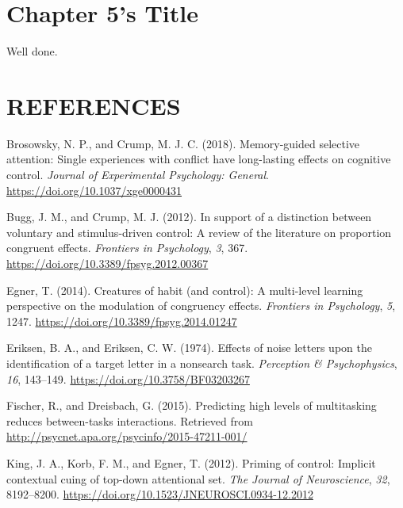 \documentclass[]{DissertateCUNY}
\begin{document}
\chapter{Chapter 5's Title}

Well done.

\FloatBarrier
\newpage

\fancyhead[R]{\thepage}
\fancyfoot[C]{}

\chapter*{REFERENCES}

\setlength{\parindent}{-0.5in}
\setlength{\leftskip}{0.5in}
\setlength{\parskip}{6pt}

\noindent

\hypertarget{refs}{}
\leavevmode\hypertarget{ref-brosowsky_memory-guided_2018}{}%
Brosowsky, N. P., and Crump, M. J. C. (2018). Memory-guided selective
attention: Single experiences with conflict have long-lasting effects on
cognitive control. \emph{Journal of Experimental Psychology: General}.
\url{https://doi.org/10.1037/xge0000431}

\leavevmode\hypertarget{ref-bugg_support_2012}{}%
Bugg, J. M., and Crump, M. J. (2012). In support of a distinction
between voluntary and stimulus-driven control: A review of the
literature on proportion congruent effects. \emph{Frontiers in
Psychology}, \emph{3}, 367.
\url{https://doi.org/10.3389/fpsyg.2012.00367}

\leavevmode\hypertarget{ref-egner_creatures_2014}{}%
Egner, T. (2014). Creatures of habit (and control): A multi-level
learning perspective on the modulation of congruency effects.
\emph{Frontiers in Psychology}, \emph{5}, 1247.
\url{https://doi.org/10.3389/fpsyg.2014.01247}

\leavevmode\hypertarget{ref-eriksen_effects_1974}{}%
Eriksen, B. A., and Eriksen, C. W. (1974). Effects of noise letters upon
the identification of a target letter in a nonsearch task.
\emph{Perception \& Psychophysics}, \emph{16}, 143--149.
\url{https://doi.org/10.3758/BF03203267}

\leavevmode\hypertarget{ref-fischer_predicting_2015}{}%
Fischer, R., and Dreisbach, G. (2015). Predicting high levels of
multitasking reduces between-tasks interactions. Retrieved from
\url{http://psycnet.apa.org/psycinfo/2015-47211-001/}

\leavevmode\hypertarget{ref-king_priming_2012}{}%
King, J. A., Korb, F. M., and Egner, T. (2012). Priming of control:
Implicit contextual cuing of top-down attentional set. \emph{The Journal
of Neuroscience}, \emph{32}, 8192--8200.
\url{https://doi.org/10.1523/JNEUROSCI.0934-12.2012}
\end{document}
